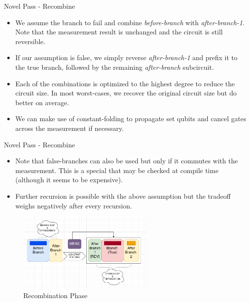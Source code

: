 \documentclass[10pt]{beamer}
\begin{document}

\begin{frame}{Novel Pass - Recombine}

  \begin{itemize}
    \item We assume the branch to fail and combine \emph{before-branch} with \emph{after-branch-1}. Note that the measurement result is unchanged and the circuit is still reversible.

      \pause

    \item If our assumption is false, we simply reverse \emph{after-branch-1} and prefix it to the true branch, followed by the remaining \emph{after-branch} subcircuit.

      \pause

    \item Each of the combinations is optimized to the highest degree to reduce the circuit size. In most worst-cases, we recover the original circuit size but do better on average.

      \pause

    \item We can make use of constant-folding to propagate set qubits and cancel gates across the measurement if necessary.
  \end{itemize}

\end{frame}


\begin{frame}{Novel Pass - Recombine}

  \begin{itemize}
    \item Note that false-branches can also be used but only if it commutes with the measurement. This is a special that may be checked at compile time (although it seems to be expensive).

      \pause

    \item Further recursion is possible with the above assumption but the tradeoff weighs negatively after every recursion.
  \end{itemize}

  \pause

  \begin{figure}
    \includegraphics[width=0.6\textwidth]{Images/recomb.png}
    \caption{Recombination Phase}
    \label{fig:recombine}
  \end{figure}


\end{frame}
\end{document}
